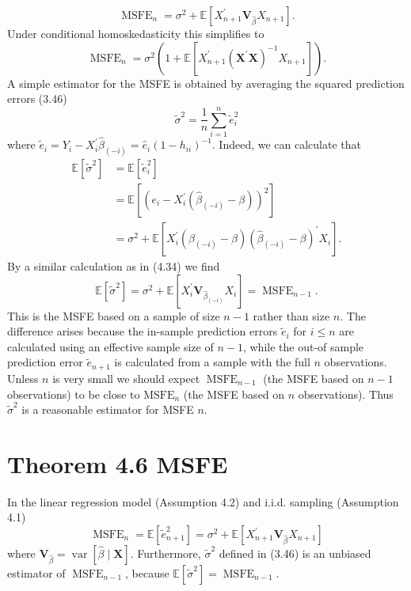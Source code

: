 \documentclass[10pt]{article}
\begin{document}
$$
\operatorname{MSFE}_{n}=\sigma^{2}+\mathbb{E}\left[X_{n+1}^{\prime} \boldsymbol{V}_{\widehat{\beta}} X_{n+1}\right] .
$$
Under conditional homoskedasticity this simplifies to
$$
\operatorname{MSFE}_{n}=\sigma^{2}\left(1+\mathbb{E}\left[X_{n+1}^{\prime}\left(\boldsymbol{X}^{\prime} \boldsymbol{X}\right)^{-1} X_{n+1}\right]\right) .
$$
A simple estimator for the MSFE is obtained by averaging the squared prediction errors (3.46)
$$
\widetilde{\sigma}^{2}=\frac{1}{n} \sum_{i=1}^{n} \widetilde{e}_{i}^{2}
$$
where $\widetilde{e}_{i}=Y_{i}-X_{i}^{\prime} \widehat{\beta}_{(-i)}=\widehat{e}_{i}\left(1-h_{i i}\right)^{-1}$. Indeed, we can calculate that
$$
\begin{aligned}
\mathbb{E}\left[\widetilde{\sigma}^{2}\right] &=\mathbb{E}\left[\widetilde{e}_{i}^{2}\right] \\
&=\mathbb{E}\left[\left(e_{i}-X_{i}^{\prime}\left(\widehat{\beta}_{(-i)}-\beta\right)\right)^{2}\right] \\
&=\sigma^{2}+\mathbb{E}\left[X_{i}^{\prime}\left(\widehat{\beta}_{(-i)}-\beta\right)\left(\widehat{\beta}_{(-i)}-\beta\right)^{\prime} X_{i}\right] .
\end{aligned}
$$
By a similar calculation as in (4.34) we find
$$
\mathbb{E}\left[\widetilde{\sigma}^{2}\right]=\sigma^{2}+\mathbb{E}\left[X_{i}^{\prime} \boldsymbol{V}_{\widehat{\beta}_{(-i)}} X_{i}\right]=\operatorname{MSFE}_{n-1} .
$$
This is the MSFE based on a sample of size $n-1$ rather than size $n$. The difference arises because the in-sample prediction errors $\widetilde{e}_{i}$ for $i \leq n$ are calculated using an effective sample size of $n-1$, while the out-of sample prediction error $\widetilde{e}_{n+1}$ is calculated from a sample with the full $n$ observations. Unless $n$ is very small we should expect $\operatorname{MSFE}_{n-1}$ (the MSFE based on $n-1$ observations) to be close to $\mathrm{MSFE}_{n}$ (the MSFE based on $n$ observations). Thus $\widetilde{\sigma}^{2}$ is a reasonable estimator for MSFE $n$.

\section{Theorem 4.6 MSFE}
In the linear regression model (Assumption 4.2) and i.i.d. sampling (Assumption 4.1)
$$
\operatorname{MSFE}_{n}=\mathbb{E}\left[\widetilde{e}_{n+1}^{2}\right]=\sigma^{2}+\mathbb{E}\left[X_{n+1}^{\prime} \boldsymbol{V}_{\widehat{\beta}} X_{n+1}\right]
$$
where $\boldsymbol{V}_{\widehat{\beta}}=\operatorname{var}[\widehat{\beta} \mid \boldsymbol{X}]$. Furthermore, $\widetilde{\sigma}^{2}$ defined in (3.46) is an unbiased estimator of $\operatorname{MSFE}_{n-1}$, because $\mathbb{E}\left[\widetilde{\sigma}^{2}\right]=\operatorname{MSFE}_{n-1}$.
\end{document}
